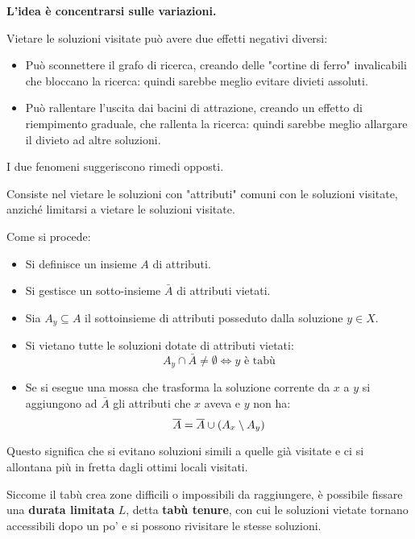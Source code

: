 \documentclass[\main/main.tex]{subfiles}
\begin{document}
\begin{multicols}{2}
\begin{observation}
    \textbf{L'idea è concentrarsi sulle variazioni.}
\end{observation}
\begin{observation}
    Vietare le soluzioni visitate può avere due effetti negativi diversi:
    \begin{itemize}
        \item Può sconnettere il grafo di ricerca, creando delle "cortine di ferro" invalicabili che bloccano la ricerca: quindi sarebbe meglio evitare divieti assoluti.
        \item Può rallentare l'uscita dai bacini di attrazione, creando un effetto di riempimento graduale, che rallenta la ricerca: quindi sarebbe meglio allargare il divieto ad altre soluzioni.
    \end{itemize}
    I due fenomeni suggeriscono rimedi opposti.
\end{observation}
\begin{definition}
    Consiste nel vietare le soluzioni con "attributi" comuni con le soluzioni visitate, anziché limitarsi a vietare le soluzioni visitate.

    Come si procede:
    \begin{itemize}
        \item Si definisce un insieme \(A\) di attributi.
        \item Si gestisce un sotto-insieme \(\bar{A}\) di attributi vietati.
        \item Sia \(A_y \subseteq A\) il sottoinsieme di attributi posseduto dalla soluzione \(y \in X\).
        \item Si vietano tutte le soluzioni dotate di attributi vietati:
        \[
            A_y \cap \bar{A} \neq \emptyset \Longleftrightarrow y \text{ è tabù}
        \]
        \item Se si esegue una mossa che trasforma la soluzione corrente da \(x\) a \(y\) si aggiungono ad \(\bar{A}\) gli attributi che \(x\) aveva e \(y\) non ha:
        \[
            \overline{A} = \overline{A} \cup \left(A_x \setminus A_y\right)
        \]
    \end{itemize}
    
    Questo significa che si evitano soluzioni simili a quelle già visitate e ci si allontana più in fretta dagli ottimi locali visitati.
\end{definition}
\begin{definition}
    Siccome il tabù crea zone difficili o impossibili da raggiungere, è possibile fissare una \textbf{durata limitata} \(L\), detta \textbf{tabù tenure}, con cui le soluzioni vietate tornano accessibili dopo un po' e si possono rivisitare le stesse soluzioni.


\end{definition}
\end{multicols}
\end{document}
